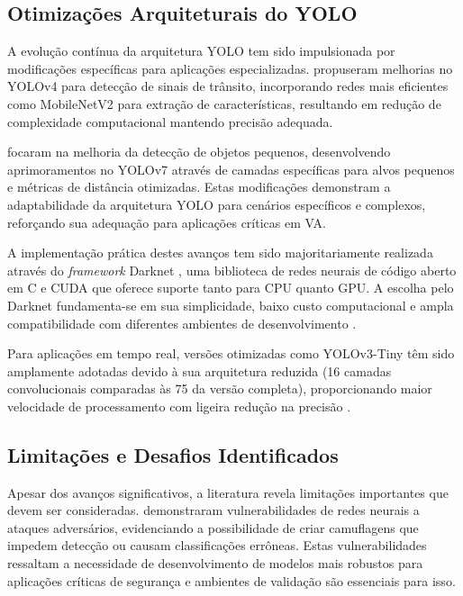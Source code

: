 \subsection{Otimizações Arquiteturais do YOLO}

A evolução contínua da arquitetura YOLO tem sido impulsionada por modificações específicas para aplicações especializadas.  propuseram melhorias no YOLOv4 para detecção de sinais de trânsito, incorporando redes mais eficientes como MobileNetV2 para extração de características, resultando em redução de complexidade computacional mantendo precisão adequada.

 focaram na melhoria da detecção de objetos pequenos, desenvolvendo aprimoramentos no YOLOv7 através de camadas específicas para alvos pequenos e métricas de distância otimizadas. Estas modificações demonstram a adaptabilidade da arquitetura YOLO para cenários específicos e complexos, reforçando sua adequação para aplicações críticas em VA.

A implementação prática destes avanços tem sido majoritariamente realizada através do \textit{framework} Darknet \cite{darknet13}, uma biblioteca de redes neurais de código aberto em C e CUDA que oferece suporte tanto para CPU quanto GPU. A escolha pelo Darknet fundamenta-se em sua simplicidade, baixo custo computacional e ampla compatibilidade com diferentes ambientes de desenvolvimento \cite{redmon2016lookonceunifiedrealtime}.

Para aplicações em tempo real, versões otimizadas como YOLOv3-Tiny têm sido amplamente adotadas devido à sua arquitetura reduzida (16 camadas convolucionais comparadas às 75 da versão completa), proporcionando maior velocidade de processamento com ligeira redução na precisão \cite{redmon2018yolov3incrementalimprovement}.

\subsection{Limitações e Desafios Identificados} \label{subsec:limitacoes}

Apesar dos avanços significativos, a literatura revela limitações importantes que devem ser consideradas.  demonstraram vulnerabilidades de redes neurais a ataques adversários, evidenciando a possibilidade de criar camuflagens que impedem detecção ou causam classificações errôneas. Estas vulnerabilidades ressaltam a necessidade de desenvolvimento de modelos mais robustos para aplicações críticas de segurança e ambientes de validação são essenciais para isso.


